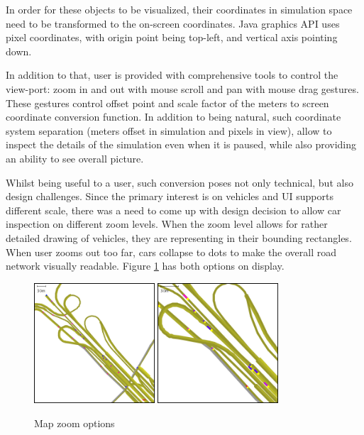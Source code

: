 In order for these objects to be visualized, their coordinates in simulation space need to be transformed to the on-screen coordinates. Java graphics API uses pixel coordinates, with origin point being top-left, and vertical axis pointing down.

In addition to that, user is provided with comprehensive tools to control the view-port: zoom in and out with mouse scroll and pan with mouse drag gestures. These gestures control offset point and scale factor of the meters to screen coordinate conversion function. In addition to being natural, such coordinate system separation (meters offset in simulation and pixels in view), allow to inspect the details of the simulation even when it is paused, while also providing an ability to see overall picture.

Whilst being useful to a user, such conversion poses not only technical, but also design challenges. Since the primary interest is on vehicles and UI supports different scale, there was a need to come up with design decision to allow car inspection on different zoom levels. When the zoom level allows for rather detailed drawing of vehicles, they are representing in their bounding rectangles. When user zooms out too far, cars collapse to dots to make the overall road network visually readable. Figure \ref{fig:mapZoomOptions} has both options on display.
\begin{figure}[!h]
    \vspace{1.5em}
    \caption{Map zoom options}
    \label{fig:mapZoomOptions}
    \centering
    \includegraphics[width=0.4\textwidth]{figs/road/zoom_dots.png}
    \hspace{0.2em}
    \includegraphics[width=0.4\textwidth]{figs/road/zoom_cars.png}
\end{figure}



